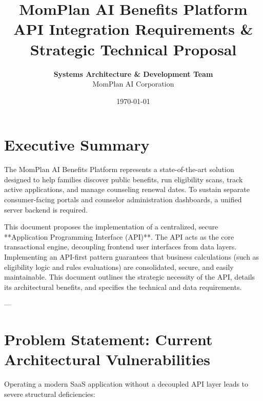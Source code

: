 \documentclass[11pt,a4paper]{article}
\title{
    \vspace{2cm}
    \textbf{\color{DeepNavy}MomPlan AI Benefits Platform} \\
    \Large{API Integration Requirements \& Strategic Technical Proposal} \\
    \vspace{1cm}
}
\author{
    \textbf{Systems Architecture \& Development Team} \\
    MomPlan AI Corporation
}
\date{\today}
\begin{document}
\maketitle
\thispagestyle{empty}
\newpage
{}

\tableofcontents
\newpage

\section{Executive Summary}
The MomPlan AI Benefits Platform represents a state-of-the-art solution designed to help families discover public benefits, run eligibility scans, track active applications, and manage counseling renewal dates. To sustain separate consumer-facing portals and counselor administration dashboards, a unified server backend is required. 

This document proposes the implementation of a centralized, secure **Application Programming Interface (API)**. The API acts as the core transactional engine, decoupling frontend user interfaces from data layers. Implementing an API-first pattern guarantees that business calculations (such as eligibility logic and rules evaluations) are consolidated, secure, and easily maintainable. This document outlines the strategic necessity of the API, details its architectural benefits, and specifies the technical and data requirements.

---

\section{Problem Statement: Current Architectural Vulnerabilities}
Operating a modern SaaS application without a decoupled API layer leads to severe structural deficiencies:
\end{document}
